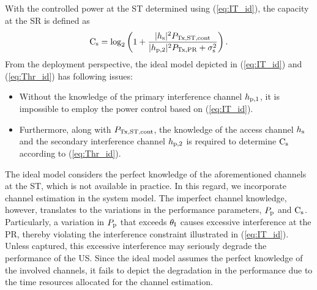 With the controlled power at the ST determined using (\ref{eq:IT_id}), the capacity at the SR is defined as
\begin{equation}
\text{C}_{\text{s}} = \log_2 \left(1 + \frac{|h_{\text{s}}|^2 P_{\text{Tx,ST,cont}}}{ |h_{\text{p,2}}|^2 P_{\text{Tx,PR}} + \sigma^2_{\text{s}}} \right). 
\label{eq:Thr_id}
\end{equation}
From the deployment perspective, the ideal model depicted in (\ref{eq:IT_id}) and (\ref{eq:Thr_id}) has following issues:
\begin{itemize}
\item Without the knowledge of the primary interference channel $h_{\text{p,1}}$, it is impossible to employ the power control based on (\ref{eq:IT_id}). 
\item Furthermore, along with $P_{\text{Tx,ST,cont}}$, the knowledge of the access channel $h_{\text{s}}$ and the secondary interference channel $h_{\text{p,2}}$ is required to determine $\text{C}_{\text{s}}$ according to (\ref{eq:Thr_id}).
\end{itemize}
The ideal model considers the perfect knowledge of the aforementioned channels at the ST, which is not available in practice. In this regard, we incorporate channel estimation in the system model. The imperfect channel knowledge, however, translates to the variations in the performance parameters, $P_{\text{p}}$ and $\text{C}_{\text{s}}$. Particularly, a variation in $P_{\text{p}}$ that exceeds $\theta_{\text{I}}$ causes excessive interference at the PR, thereby violating the interference constraint illustrated in (\ref{eq:IT_id}). Unless captured, this excessive interference may seriously degrade the performance of the US. Since the ideal model assumes the perfect knowledge of the involved channels, it fails to depict the degradation in the performance due to the time resources allocated for the channel estimation. %

